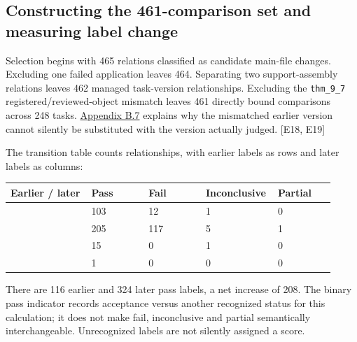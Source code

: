 \subsection[Constructing the 461-comparison set and measuring label change]{\texorpdfstring{\protect\hypertarget{c3}{}Constructing the 461-comparison set and measuring label change}{Constructing the 461-comparison set and measuring label change}}
Selection begins with 465 relations classified as candidate main-file changes. Excluding one failed application leaves 464. Separating two support-assembly relations leaves 462 managed task-version relationships. Excluding the \nolinkurl{thm_9_7} registered/reviewed-object mismatch leaves 461 directly bound comparisons across 248 tasks. \hyperlink{b7}{Appendix B.7} explains why the mismatched earlier version cannot silently be substituted with the version actually judged. [E18, E19]

The transition table counts relationships, with earlier labels as rows and later labels as columns:

\begingroup\small\setlength{\tabcolsep}{3pt}\renewcommand{\arraystretch}{1.14}
\par\nopagebreak\medskip\noindent\begin{minipage}[t]{\linewidth}
\begin{tabular}{>{\raggedright\arraybackslash}p{0.24\linewidth}>{\raggedright\arraybackslash}p{0.17\linewidth}>{\raggedright\arraybackslash}p{0.17\linewidth}>{\raggedright\arraybackslash}p{0.17\linewidth}>{\raggedright\arraybackslash}p{0.17\linewidth}}
\toprule
\textbf{Earlier / later} & \textbf{Pass} & \textbf{Fail} & \textbf{Inconclusive} & \textbf{Partial}\\\midrule

{Pass} & {103} & {12} & {1} & {0}\\
{Fail} & {205} & {117} & {5} & {1}\\
{Inconclusive} & {15} & {0} & {1} & {0}\\
{Partial} & {1} & {0} & {0} & {0}\\
\bottomrule\end{tabular}\end{minipage}\par\medskip\endgroup
There are 116 earlier and 324 later pass labels, a net increase of 208. The binary pass indicator records acceptance versus another recognized status for this calculation; it does not make fail, inconclusive and partial semantically interchangeable. Unrecognized labels are not silently assigned a score.

